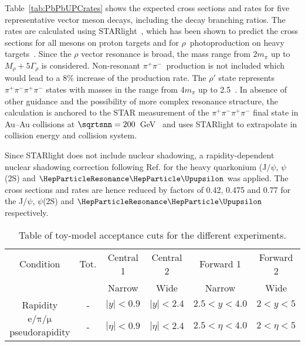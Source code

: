 \documentclass[../report.tex]{subfiles}
\begin{document}
Table~\ref{tab:PbPbUPCrates} shows the expected cross sections and rates for five representative vector meson decays, including the decay branching ratios.  The rates are calculated using STARlight~\cite{Klein:2016yzr}, which has been shown to predict the cross sections for all mesons on proton targets and for $\rho$~photoproduction on heavy targets~\cite{Adam:2015gsa,Abelev:2007nb}. Since the $\rho$ vector resonance is broad, the mass range from $2m_\pi$ up to $M_\rho + 5\Gamma_\rho$ is considered.  Non-resonant $\pi^+\pi^-$~production is not included which would lead to a 8\% increase of the production rate.  
The $\rho'$ state represents $\pi^+\pi^-\pi^+\pi^-$ states with masses in the range from 4$m_{\pi}$ up to 2.5~\UGeVcc. In absence of other guidance and the possibility of more complex resonance structure, the calculation is anchored to the STAR measurement of the $\pi^+\pi^-\pi^+\pi^-$ final state in Au--Au collisions at $\sqrtsnn=200$~GeV~\cite{Abelev:2009aa} and uses STARlight to extrapolate in collision energy and collision system. 

Since STARlight does not include nuclear shadowing, a rapidity-dependent nuclear shadowing correction following Ref. \cite{Guzey:2016piu} for the heavy quarkonium (J$/\psi$, $\psi$(2S) and $\PGUP{}$ was applied.  The cross sections and rates  are hence reduced by factors of 0.42, 0.475 and 0.77 for the J/$\psi$, $\psi$(2S) and $\PGUP{}$ respectively.  

\begin{table}[h]
\centering
\caption{Table of toy-model acceptance cuts for the different experiments.}
\begin{tabular}{|c|ccccc|}
\hline
Condition & Tot. & Central 1 & Central 2 & Forward 1 &  Forward 2   \\
                 &       & Narrow  & Wide    &      Narrow     &    Wide         \\
\hline
Rapidity & - & $|y|<0.9$ & $|y|<2.4$ & $2.5 < y < 4.0$ &   $2 < y < 5$ \\
$\mathrm{e/\pi/\mu}$ pseudorapidity & - & $|\eta|<0.9$ & $|\eta|<2.4$  & $2.5 < \eta < 4.0$ & $2 < \eta <5 $ \\
\hline
\end{tabular}
\label{tab:UPCtoyacceptance}
\end{table}
\end{document}
